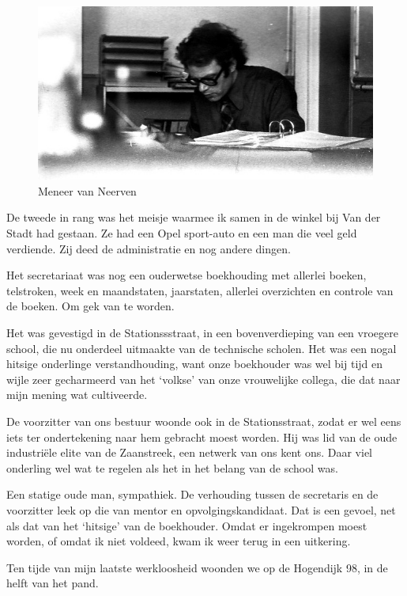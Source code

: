\documentclass[12pt,twoside, openright]{memoir}
\begin{document}
\begin{figure}
\centering
\includegraphics[width=\textwidth]{img/ch41/IMG_0002}
\caption*{\footnotesize Meneer van Neerven}
\end{figure}

De tweede in rang was het meisje waarmee ik samen in de winkel bij Van der Stadt had gestaan. Ze had een Opel sport-auto en een man die veel geld verdiende. Zij deed de administratie en nog andere dingen. 

Het secretariaat was nog een ouderwetse boekhouding met allerlei boeken, telstroken, week en maandstaten, jaarstaten, allerlei overzichten en controle van de boeken. Om gek van te worden. 

Het was gevestigd in de Stationssstraat, in een bovenverdieping van een vroegere school, die nu onderdeel uitmaakte van de technische scholen. Het was een nogal hitsige onderlinge verstandhouding, want onze boekhouder was wel bij tijd en wijle zeer gecharmeerd van het `volkse' van onze vrouwelijke collega, die dat naar mijn mening wat cultiveerde. 

De voorzitter van ons bestuur woonde ook in de Stationsstraat, zodat er wel eens iets ter ondertekening naar hem gebracht moest worden. Hij was lid van de oude industriële elite van de Zaanstreek, een netwerk van ons kent ons. Daar viel onderling wel wat te regelen als het in het belang van de school was. 

Een statige oude man, sympathiek. De verhouding tussen de secretaris en de voorzitter leek op die van mentor en opvolgingskandidaat. Dat is een gevoel, net als dat van het `hitsige' van de boekhouder. Omdat er ingekrompen moest worden, of omdat ik niet voldeed, kwam ik weer terug in een uitkering.

Ten tijde van mijn laatste werkloosheid woonden we op de Hogendijk 98, in de helft van het pand.
\end{document}
